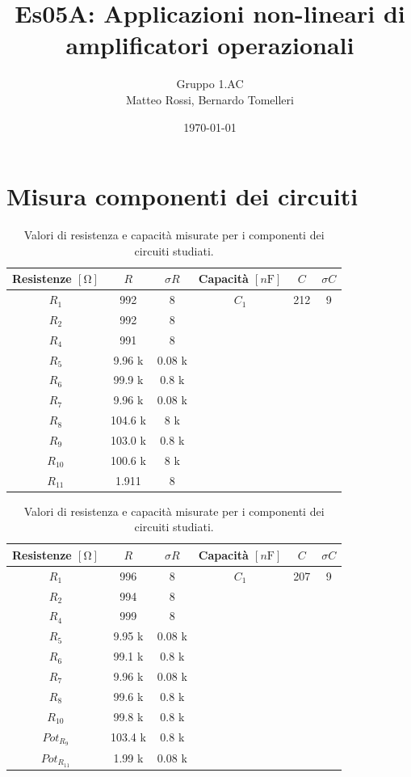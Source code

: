 \documentclass[10pt, a4paper, italian]{article}
\author{Gruppo 1.AC \\ Matteo Rossi, Bernardo Tomelleri}
\title{Es05A: Applicazioni non-lineari di amplificatori operazionali}
\begin{document}
\date{\today}
\maketitle

\setcounter{section}{0}

\section*{Misura componenti dei circuiti}
\begin{table}[htbp]
\centering
\begin{tabular}{cccccc}
\toprule
Resistenze $[\si{\ohm}]$ & $R$ & $\sigma R$ & Capacità $[\si{n\F}]$ & $C$ &
$\sigma C$ \\
\midrule
\midrule
$R_1$	  	& 992 	& 8		& $C_1$ & 212	& 9 \\
$R_2$	  	& 992	& 8		& & & \\
$R_4$	  	& 991	& 8		& & & \\
$R_5$	  	& 9.96 k	& 0.08	k& & & \\
$R_6$	  	& 99.9 k	& 0.8	k& & & \\
$R_7$	  	& 9.96 k& 0.08	k	& & & \\
$R_8$	  	& 104.6	k& 8		k& & & \\
$R_9$	  	& 103.0	k& 0.8	k	& & & \\
$R_{10}$  	& 100.6	k& 8		k& & & \\
$R_{11}$  	& 1.911	& 8		& & & \\
\bottomrule     
\end{tabular}
\caption{Valori di resistenza e capacità misurate per i componenti dei
circuiti studiati. \label{tab: rcmes_B}}

\begin{tabular}{cccccc}
\toprule
Resistenze $[\si{\ohm}]$ & $R$ & $\sigma R$ & Capacità $[\si{n\F}]$ & $C$ &
$\sigma C$ \\
\midrule
\midrule
$R_1$	  	& 996 	& 8		& $C_1$ & 207	& 9 \\
$R_2$	  	& 994	& 8		& & & \\
$R_4$	  	& 999	& 8		& & & \\
$R_5$	  	& 9.95	k& 0.08	k& & & \\
$R_6$	  	& 99.1	k& 0.8	k& & & \\
$R_7$	  	& 9.96	k& 0.08		k& & & \\
$R_8$	  	& 99.6	k& 0.8		k& & & \\
$R_{10}$  	& 99.8	k& 0.8		k& & & \\
$Pot_{R_9}$ & 103.4 k & 0.8 k& & & \\
$Pot_{R_11}$& 1.99 k & 0.08 k& & &\\
\bottomrule   
\end{tabular}
\caption{Valori di resistenza e capacità misurate per i componenti dei
circuiti studiati. \label{tab: rcmes_M}}
\end{table}
\end{document}
